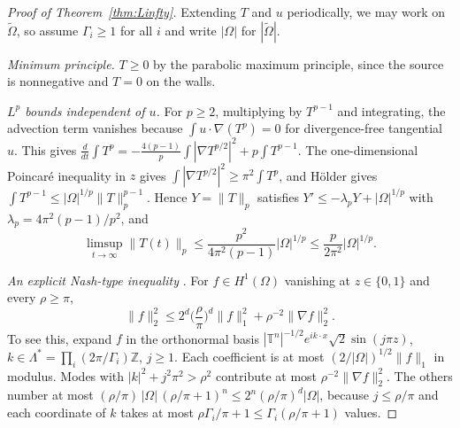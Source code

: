 \begin{proof}[Proof of Theorem~\ref{thm:Linfty}]
Extending $T$ and $u$ periodically, we may work on $\tilde\Omega$, so assume $\Gamma_i\ge1$ for all $i$ and write
$|\Omega|$ for $|\tilde\Omega|$.

\emph{Minimum principle.} $T\ge0$ by the parabolic maximum principle, since the source is nonnegative and
$T=0$ on the walls.

\emph{$L^p$ bounds independent of $u$.} For $p\ge2$, multiplying by $T^{p-1}$ and integrating, the advection
term vanishes because $\int u\cdot\nabla(T^p)=0$ for divergence-free tangential $u$. This gives
$\frac d{dt}\int T^p=-\frac{4(p-1)}{p}\int|\nabla T^{p/2}|^2+p\int T^{p-1}$. The one-dimensional Poincar\'e
inequality in $z$ gives $\int|\nabla T^{p/2}|^2\ge\pi^2\int T^p$, and Hölder gives $\int T^{p-1}\le|\Omega|^{1/p}\|T\|_p^{p-1}$.
Hence $Y=\|T\|_p$ satisfies $Y'\le-\lambda_pY+|\Omega|^{1/p}$ with $\lambda_p=4\pi^2(p-1)/p^2$, and
\begin{equation}\label{eq:Lp}
\limsup_{t\to\infty}\|T(t)\|_p\le\frac{p^2}{4\pi^2(p-1)}|\Omega|^{1/p}\le\frac{p}{2\pi^2}|\Omega|^{1/p}.
\end{equation}

\emph{An explicit Nash-type inequality} \citep{Nash1958}. For $f\in H^1(\Omega)$ vanishing at $z\in\{0,1\}$ and every $\rho\ge\pi$,
\begin{equation}\label{eq:nash}
\|f\|_2^2\le2^d\Big(\frac\rho\pi\Big)^d\|f\|_1^2+\rho^{-2}\|\nabla f\|_2^2 .
\end{equation}
To see this, expand $f$ in the orthonormal basis $|\mathbb T^n|^{-1/2}e^{ik\cdot x}\sqrt2\sin(j\pi z)$,
$k\in\Lambda^*=\prod_i(2\pi/\Gamma_i)\mathbb Z$, $j\ge1$. Each coefficient is at most $(2/|\Omega|)^{1/2}\|f\|_1$ in
modulus. Modes with $|k|^2+j^2\pi^2>\rho^2$ contribute at most $\rho^{-2}\|\nabla f\|_2^2$. The others number at
most $(\rho/\pi)\,|\Omega|\,(\rho/\pi+1)^n\le2^n(\rho/\pi)^d|\Omega|$, because $j\le\rho/\pi$ and each coordinate of $k$
takes at most $\rho\Gamma_i/\pi+1\le\Gamma_i(\rho/\pi+1)$ values.


\end{proof}
